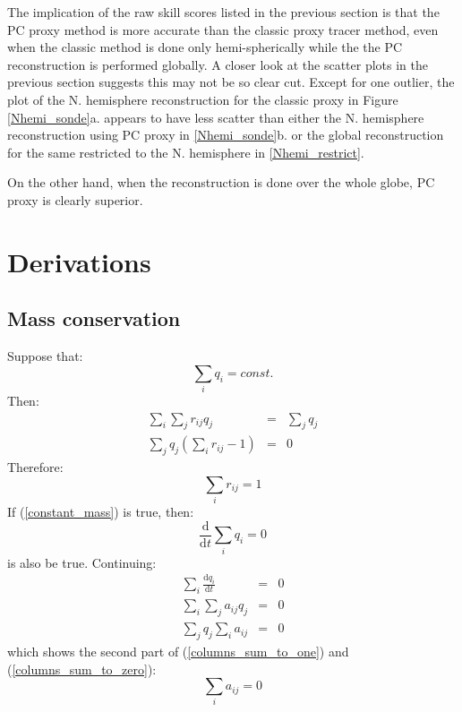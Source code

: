 \documentclass{article}
\begin{document}
The implication of the raw skill scores listed in the previous section is that the PC proxy method
is more accurate than the classic proxy tracer method, even when the classic
method is done only hemi-spherically while the the PC reconstruction is
performed globally.
A closer look at the scatter plots in the previous section suggests this may
not be so clear cut.
Except for one outlier, the plot of the N. hemisphere reconstruction for
the classic proxy in Figure \ref{Nhemi_sonde}a. appears to have less scatter than either the N. hemisphere
reconstruction using PC proxy in \ref{Nhemi_sonde}b. or the global reconstruction for the same
restricted to the N. hemisphere in \ref{Nhemi_restrict}.

On the other hand, when the reconstruction is done over the whole globe,
PC proxy is clearly superior.




\appendix

\section{Derivations}

\subsection{Mass conservation}

\label{mass_conservation_derivation}

Suppose that:
\begin{equation}
	\sum_i q_i = const.
	\label{constant_mass}
\end{equation}
Then:
\begin{eqnarray}
	\sum_i \sum_j r_{ij} q_j & = & \sum_j q_j \\
	\sum_j q_j \left ( \sum_i r_{ij} - 1 \right ) & = & 0
\end{eqnarray}
Therefore:
\begin{equation}
	\sum_i r_{ij} = 1
\end{equation}
If (\ref{constant_mass}) is true, then:
\begin{equation}
	\frac{\mathrm d}{\mathrm d t}\sum_i q_i = 0
\end{equation}
is also be true. Continuing:
\begin{eqnarray}
	\sum_i \frac{\mathrm d q_i}{\mathrm d t} & = & 0 \\
\sum_i \sum_j a_{ij} q_j & = & 0 \\
\sum_j q_j \sum_i a_{ij} & = & 0
\end{eqnarray}
which shows the second part of (\ref{columns_sum_to_one}) and 
(\ref{columns_sum_to_zero}):
\begin{equation}
	\sum_i a_{ij} = 0
\end{equation}
\end{document}
